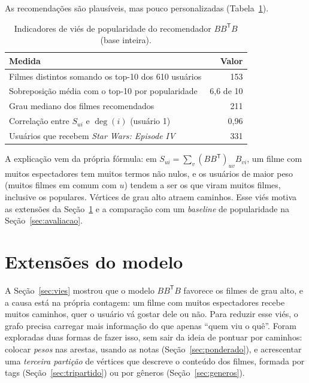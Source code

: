 \documentclass[12pt,a4paper]{article}
\theoremstyle{definition}
\begin{document}
As recomendações são plausíveis, mas pouco personalizadas
(Tabela~\ref{tab:vies}).

\begin{table}[ht]
\centering
\begin{tabular}{lr}
\toprule
Medida & Valor \\
\midrule
Filmes distintos somando os top-10 dos 610 usuários & 153 \\
Sobreposição média com o top-10 por popularidade & 6{,}6 de 10 \\
Grau mediano dos filmes recomendados & 211 \\
Correlação entre $S_{ui}$ e $\deg(i)$ (usuário 1) & 0{,}96 \\
Usuários que recebem \emph{Star Wars: Episode IV} & 331 \\
\bottomrule
\end{tabular}
\caption{Indicadores de viés de popularidade do recomendador
$BB^{\mathsf T}B$ (base inteira).}
\label{tab:vies}
\end{table}

A explicação vem da própria fórmula: em
$S_{ui} = \sum_v (BB^{\mathsf T})_{uv} B_{vi}$, um filme com muitos
espectadores tem muitos termos não nulos, e os usuários de maior peso
(muitos filmes em comum com $u$) tendem a ser os que viram muitos filmes,
inclusive os populares. Vértices de grau alto atraem caminhos. Esse viés
motiva as extensões da Seção~\ref{sec:extensoes} e a comparação com um
\emph{baseline} de popularidade na Seção~\ref{sec:avaliacao}.

\section{Extensões do modelo}\label{sec:extensoes}

A Seção~\ref{sec:vies} mostrou que o modelo $BB^{\mathsf T}B$ favorece
os filmes de grau alto, e a causa está na própria contagem: um filme
com muitos espectadores recebe muitos caminhos, quer o usuário vá
gostar dele ou não. Para reduzir esse viés, o grafo precisa carregar
mais informação do que apenas ``quem viu o quê''. Foram exploradas duas formas
de fazer isso, sem sair da ideia de pontuar por caminhos: colocar
\emph{pesos} nas arestas, usando as notas
(Seção~\ref{sec:ponderado}), e acrescentar uma \emph{terceira partição}
de vértices que descreve o conteúdo dos filmes, formada por tags
(Seção~\ref{sec:tripartido}) ou por gêneros
(Seção~\ref{sec:generos}).
\end{document}

